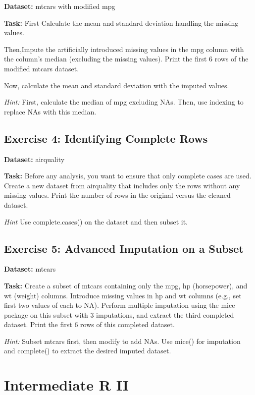 \documentclass[
]{book}
\begin{document}
\textbf{Dataset:} mtcars with modified mpg

\textbf{Task:} First Calculate the mean and standard deviation handling the
missing values.

Then,Impute the artificially introduced missing values in the mpg column
with the column's median (excluding the missing values). Print the first
6 rows of the modified mtcars dataset.

Now, calculate the mean and standard deviation with the imputed values.

\emph{Hint:} First, calculate the median of mpg excluding NAs. Then, use
indexing to replace NAs with this median.

\section*{Exercise 4: Identifying Complete Rows}\label{exercise-4-identifying-complete-rows}

\textbf{Dataset:} airquality

\textbf{Task:} Before any analysis, you want to ensure that only complete
cases are used. Create a new dataset from airquality that includes only
the rows without any missing values. Print the number of rows in the
original versus the cleaned dataset.

\emph{Hint} Use complete.cases() on the dataset and then subset it.

\section*{Exercise 5: Advanced Imputation on a Subset}\label{exercise-5-advanced-imputation-on-a-subset}

\textbf{Dataset:} mtcars

\textbf{Task:} Create a subset of mtcars containing only the mpg, hp
(horsepower), and wt (weight) columns. Introduce missing values in hp
and wt columns (e.g., set first two values of each to NA). Perform
multiple imputation using the mice package on this subset with 3
imputations, and extract the third completed dataset. Print the first 6
rows of this completed dataset.

\emph{Hint:} Subset mtcars first, then modify to add NAs. Use mice() for
imputation and complete() to extract the desired imputed dataset.

\chapter*{Intermediate R II}\label{intermediate-r-ii}
\end{document}
